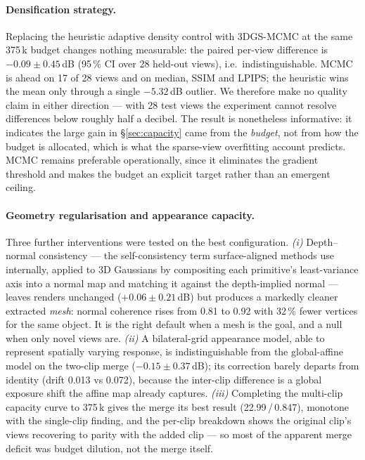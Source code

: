 \paragraph{Densification strategy.}
Replacing the heuristic adaptive density control with 3DGS-MCMC
\cite{kheradmand2024mcmc} at the same 375\,k budget changes nothing measurable:
the paired per-view difference is $-0.09 \pm 0.45$\,dB (95\,\% CI over 28 held-out
views), i.e.\ indistinguishable. MCMC is ahead on 17 of 28 views and on median,
SSIM and LPIPS; the heuristic wins the mean only through a single $-5.32$\,dB
outlier. We therefore make no quality claim in either direction --- with 28 test
views the experiment cannot resolve differences below roughly half a decibel. The
result is nonetheless informative: it indicates the large gain in
\S\ref{sec:capacity} came from the \emph{budget}, not from how the budget is
allocated, which is what the sparse-view overfitting account predicts. MCMC remains
preferable operationally, since it eliminates the gradient threshold and makes the
budget an explicit target rather than an emergent ceiling.

\paragraph{Geometry regularisation and appearance capacity.}
Three further interventions were tested on the best configuration. \emph{(i)}
Depth--normal consistency --- the self-consistency term surface-aligned methods use
internally, applied to 3D Gaussians by compositing each primitive's least-variance
axis into a normal map and matching it against the depth-implied normal --- leaves
renders unchanged ($+0.06\pm0.21$\,dB) but produces a markedly cleaner extracted
\emph{mesh}: normal coherence rises from 0.81 to 0.92 with 32\,\% fewer vertices for
the same object. It is the right default when a mesh is the goal, and a null when only
novel views are. \emph{(ii)} A bilateral-grid appearance model, able to represent
spatially varying response, is indistinguishable from the global-affine model on the
two-clip merge ($-0.15\pm0.37$\,dB); its correction barely departs from identity
(drift 0.013 vs 0.072), because the inter-clip difference is a global exposure shift
the affine map already captures. \emph{(iii)} Completing the multi-clip capacity curve
to 375\,k gives the merge its best result (22.99\,/\,0.847), monotone with the
single-clip finding, and the per-clip breakdown shows the original clip's views
recovering to parity with the added clip --- so most of the apparent merge deficit was
budget dilution, not the merge itself.

